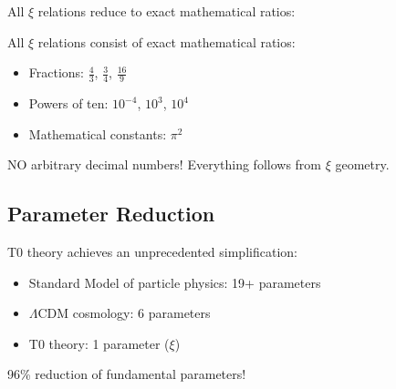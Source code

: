 	All $\xi$ relations reduce to exact mathematical ratios:
	
	\begin{table}[htbp]
		\centering
		\caption{Dimensionless $\xi$ ratios in T0 theory}
	\end{table}
	
	\begin{important}
		All $\xi$ relations consist of exact mathematical ratios:
		\begin{itemize}
			\item Fractions: $\frac{4}{3}$, $\frac{3}{4}$, $\frac{16}{9}$
			\item Powers of ten: $10^{-4}$, $10^3$, $10^4$
			\item Mathematical constants: $\pi^2$
		\end{itemize}
		NO arbitrary decimal numbers! Everything follows from $\xi$ geometry.
	\end{important}
	
	\subsection{Parameter Reduction}
	
	\begin{revolutionary}
		T0 theory achieves an unprecedented simplification:
		\begin{itemize}
			\item Standard Model of particle physics: 19+ parameters
			\item $\Lambda$CDM cosmology: 6 parameters
			\item T0 theory: 1 parameter ($\xi$)
		\end{itemize}
		96\% reduction of fundamental parameters!
	\end{revolutionary}
	
